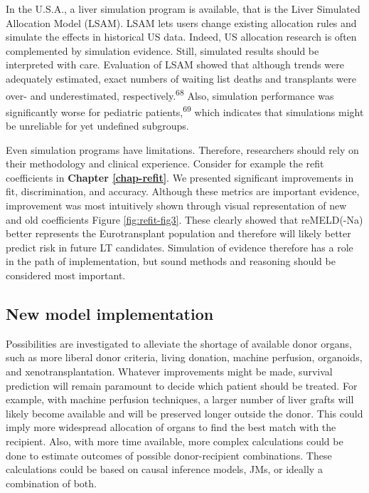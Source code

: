 \documentclass[11pt,english,]{book} %
\begin{document}
In the U.S.A., a liver simulation program is available, that is the Liver Simulated Allocation Model (LSAM). LSAM lets users change existing allocation rules and simulate the effects in historical US data. Indeed, US allocation research is often complemented by simulation evidence. Still, simulated results should be interpreted with care. Evaluation of LSAM showed that although trends were adequately estimated, exact numbers of waiting list deaths and transplants were over- and underestimated, respectively.\textsuperscript{68} Also, simulation performance was significantly worse for pediatric patients,\textsuperscript{69} which indicates that simulations might be unreliable for yet undefined subgroups.

Even simulation programs have limitations. Therefore, researchers should rely on their methodology and clinical experience. Consider for example the refit coefficients in \textbf{Chapter \ref{chap-refit}}. We presented significant improvements in fit, discrimination, and accuracy. Although these metrics are important evidence, improvement was most intuitively shown through visual representation of new and old coefficients Figure \ref{fig:refit-fig3}. These clearly showed that reMELD(-Na) better represents the Eurotransplant population and therefore will likely better predict risk in future LT candidates. Simulation of evidence therefore has a role in the path of implementation, but sound methods and reasoning should be considered most important.

\hypertarget{new-model-implementation}{%
\subsection*{New model implementation}\label{new-model-implementation}}

Possibilities are investigated to alleviate the shortage of available donor organs, such as more liberal donor criteria, living donation, machine perfusion, organoids, and xenotransplantation. Whatever improvements might be made, survival prediction will remain paramount to decide which patient should be treated. For example, with machine perfusion techniques, a larger number of liver grafts will likely become available and will be preserved longer outside the donor. This could imply more widespread allocation of organs to find the best match with the recipient. Also, with more time available, more complex calculations could be done to estimate outcomes of possible donor-recipient combinations. These calculations could be based on causal inference models, JMs, or ideally a combination of both.
\end{document}
